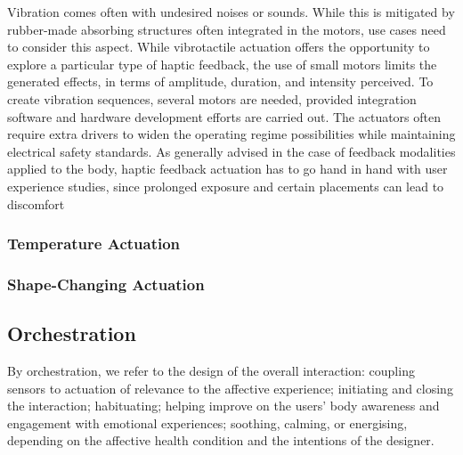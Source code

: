 Vibration comes often with undesired noises or sounds. While this is mitigated by rubber-made absorbing structures often integrated in the motors, use cases need to consider this aspect. While vibrotactile actuation offers the opportunity to explore a particular type of haptic feedback, the use of small motors limits the generated effects, in terms of amplitude, duration, and intensity perceived. To create vibration sequences, several motors are needed, provided integration software and hardware development efforts are carried out. The actuators often require extra drivers to widen the operating regime possibilities while maintaining electrical safety standards. As generally advised in the case of feedback modalities applied to the body, haptic feedback actuation has to go hand in hand with user experience studies, since prolonged exposure and certain placements can lead to discomfort

\subsubsection{Temperature Actuation}

\subsubsection{Shape-Changing Actuation}



\subsection{Orchestration} 

By orchestration, we refer to the design of the overall interaction: coupling sensors to actuation of relevance to the affective experience; initiating and closing the interaction; habituating; helping improve on the users' body awareness and engagement with emotional experiences; soothing, calming, or energising, depending on the affective health condition and the intentions of the designer. 

